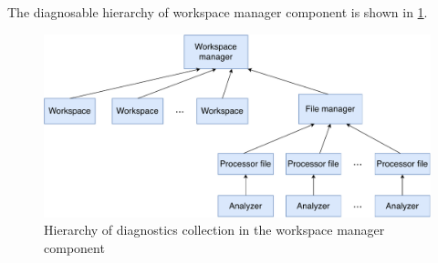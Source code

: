 The diagnosable hierarchy of workspace manager component is shown in \cref{diagnosable_hierarchy}.

\begin{figure}
	\centering
	\includegraphics[width=\textwidth]{img/diagnosable_hierarchy}
	\caption{Hierarchy of diagnostics collection in the workspace manager component}
	\label{diagnosable_hierarchy}
\end{figure}